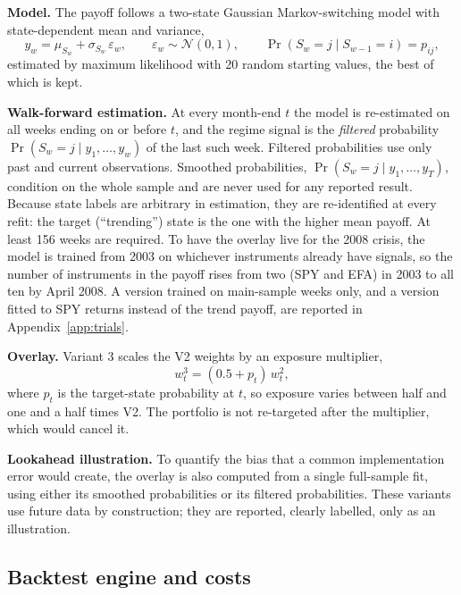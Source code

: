 \documentclass[11pt,a4paper]{article}
\begin{document}
\textbf{Model.} The payoff follows a two-state Gaussian Markov-switching model \citep{hamilton1989} with state-dependent mean and variance,
\begin{equation}
y_w = \mu_{S_w} + \sigma_{S_w}\, \varepsilon_w, \qquad \varepsilon_w \sim \mathcal{N}(0,1), \qquad \Pr(S_w = j \mid S_{w-1} = i) = p_{ij},
\end{equation}
estimated by maximum likelihood with 20 random starting values, the best of which is kept.

\textbf{Walk-forward estimation.} At every month-end $t$ the model is re-estimated on all weeks ending on or before $t$, and the regime signal is the \emph{filtered} probability $\Pr(S_w = j \mid y_1, \ldots, y_w)$ of the last such week. Filtered probabilities use only past and current observations. Smoothed probabilities, $\Pr(S_w = j \mid y_1, \ldots, y_T)$, condition on the whole sample and are never used for any reported result. Because state labels are arbitrary in estimation, they are re-identified at every refit: the target (``trending'') state is the one with the higher mean payoff. At least 156 weeks are required. To have the overlay live for the 2008 crisis, the model is trained from 2003 on whichever instruments already have signals, so the number of instruments in the payoff rises from two (SPY and EFA) in 2003 to all ten by April 2008. A version trained on main-sample weeks only, and a version fitted to SPY returns instead of the trend payoff, are reported in Appendix~\ref{app:trials}.

\textbf{Overlay.} Variant 3 scales the V2 weights by an exposure multiplier,
\begin{equation}
w^{\mathrm{3}}_{t} = (0.5 + p_t)\, w^{\mathrm{2}}_{t},
\end{equation}
where $p_t$ is the target-state probability at $t$, so exposure varies between half and one and a half times V2. The portfolio is not re-targeted after the multiplier, which would cancel it.

\textbf{Lookahead illustration.} To quantify the bias that a common implementation error would create, the overlay is also computed from a single full-sample fit, using either its smoothed probabilities or its filtered probabilities. These variants use future data by construction; they are reported, clearly labelled, only as an illustration.

\subsection{Backtest engine and costs}
\end{document}
